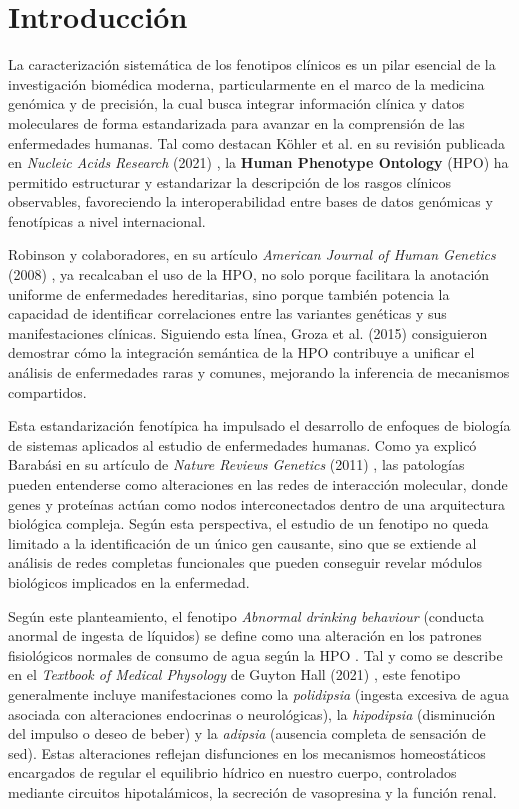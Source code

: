\section{Introducción}

La caracterización sistemática de los fenotipos clínicos es un pilar esencial de la investigación biomédica moderna, particularmente en el marco de la medicina genómica y de precisión, la cual busca integrar información clínica y datos moleculares de forma estandarizada para avanzar en la comprensión de las enfermedades humanas. Tal como destacan Köhler et al. en su revisión publicada en \textit{Nucleic Acids Research} (2021) \cite{kohler2021hpo}, la \textbf{Human Phenotype Ontology} (HPO) \cite{robinson2008hpo} ha permitido estructurar y estandarizar la descripción de los rasgos clínicos observables, favoreciendo la interoperabilidad entre bases de datos genómicas y fenotípicas a nivel internacional.

Robinson y colaboradores, en su artículo \textit{American Journal of Human Genetics} (2008) \cite{robinson2008hpo}, ya recalcaban el uso de la HPO, no solo porque facilitara la anotación uniforme de enfermedades hereditarias, sino porque también potencia la capacidad de identificar correlaciones entre las variantes genéticas y sus manifestaciones clínicas. Siguiendo esta línea, Groza et al. (2015) \cite{groza2015hpo} consiguieron demostrar cómo la integración semántica de la HPO contribuye a unificar el análisis de enfermedades raras y comunes, mejorando la inferencia de mecanismos compartidos.

Esta estandarización fenotípica ha impulsado el desarrollo de enfoques de biología de sistemas aplicados al estudio de enfermedades humanas. Como ya explicó Barabási en su artículo de \textit{Nature Reviews Genetics} (2011) \cite{Barabasi2011_networkMedicine}, las patologías pueden entenderse como alteraciones en las redes de interacción molecular, donde genes y proteínas actúan como nodos interconectados dentro de una arquitectura biológica compleja. Según esta perspectiva, el estudio de un fenotipo no queda limitado a la identificación de un único gen causante, sino que se extiende al análisis de redes completas funcionales que pueden conseguir revelar módulos biológicos implicados en la enfermedad.

Según este planteamiento, el fenotipo \textit{Abnormal drinking behaviour} (conducta anormal de ingesta de líquidos) se define como una alteración en los patrones fisiológicos normales de consumo de agua según la HPO \cite{kohler2021hpo}. Tal y como se describe en el \textit{Textbook of Medical Physology} de Guyton Hall (2021) \cite{guyton2021physiology}, este fenotipo generalmente incluye manifestaciones como la \textit{polidipsia} (ingesta excesiva de agua asociada con alteraciones endocrinas o neurológicas), la \textit{hipodipsia} (disminución del impulso o deseo de beber) y la \textit{adipsia} (ausencia completa de sensación de sed). Estas alteraciones reflejan disfunciones en los mecanismos homeostáticos encargados de regular el equilibrio hídrico en nuestro cuerpo, controlados mediante circuitos hipotalámicos, la secreción de vasopresina y la función renal.

